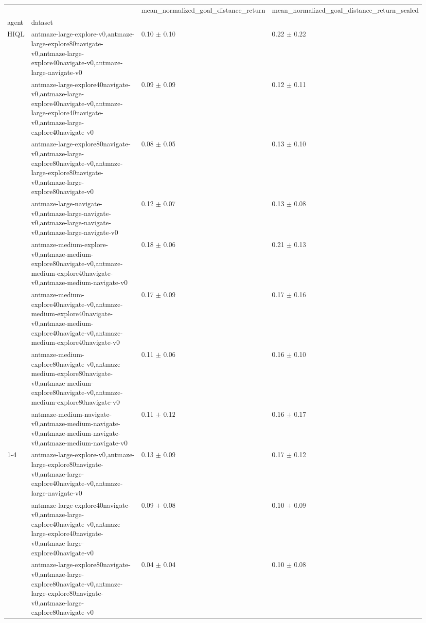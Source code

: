 \begin{tabular}{llll}
\toprule
 &  & mean_normalized_goal_distance_return & mean_normalized_goal_distance_return_scaled \\
agent & dataset &  &  \\
\midrule
\multirow[t]{8}{*}{HIQL} & antmaze-large-explore-v0,antmaze-large-explore80navigate-v0,antmaze-large-explore40navigate-v0,antmaze-large-navigate-v0 & 0.10 $\pm$ 0.10 & 0.22 $\pm$ 0.22 \\
 & antmaze-large-explore40navigate-v0,antmaze-large-explore40navigate-v0,antmaze-large-explore40navigate-v0,antmaze-large-explore40navigate-v0 & 0.09 $\pm$ 0.09 & 0.12 $\pm$ 0.11 \\
 & antmaze-large-explore80navigate-v0,antmaze-large-explore80navigate-v0,antmaze-large-explore80navigate-v0,antmaze-large-explore80navigate-v0 & 0.08 $\pm$ 0.05 & 0.13 $\pm$ 0.10 \\
 & antmaze-large-navigate-v0,antmaze-large-navigate-v0,antmaze-large-navigate-v0,antmaze-large-navigate-v0 & 0.12 $\pm$ 0.07 & 0.13 $\pm$ 0.08 \\
 & antmaze-medium-explore-v0,antmaze-medium-explore80navigate-v0,antmaze-medium-explore40navigate-v0,antmaze-medium-navigate-v0 & 0.18 $\pm$ 0.06 & 0.21 $\pm$ 0.13 \\
 & antmaze-medium-explore40navigate-v0,antmaze-medium-explore40navigate-v0,antmaze-medium-explore40navigate-v0,antmaze-medium-explore40navigate-v0 & 0.17 $\pm$ 0.09 & 0.17 $\pm$ 0.16 \\
 & antmaze-medium-explore80navigate-v0,antmaze-medium-explore80navigate-v0,antmaze-medium-explore80navigate-v0,antmaze-medium-explore80navigate-v0 & 0.11 $\pm$ 0.06 & 0.16 $\pm$ 0.10 \\
 & antmaze-medium-navigate-v0,antmaze-medium-navigate-v0,antmaze-medium-navigate-v0,antmaze-medium-navigate-v0 & 0.11 $\pm$ 0.12 & 0.16 $\pm$ 0.17 \\
\cline{1-4}
\multirow[t]{8}{*}{QRL} & antmaze-large-explore-v0,antmaze-large-explore80navigate-v0,antmaze-large-explore40navigate-v0,antmaze-large-navigate-v0 & 0.13 $\pm$ 0.09 & 0.17 $\pm$ 0.12 \\
 & antmaze-large-explore40navigate-v0,antmaze-large-explore40navigate-v0,antmaze-large-explore40navigate-v0,antmaze-large-explore40navigate-v0 & 0.09 $\pm$ 0.08 & 0.10 $\pm$ 0.09 \\
 & antmaze-large-explore80navigate-v0,antmaze-large-explore80navigate-v0,antmaze-large-explore80navigate-v0,antmaze-large-explore80navigate-v0 & 0.04 $\pm$ 0.04 & 0.10 $\pm$ 0.08 \\

\end{tabular}
